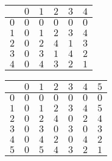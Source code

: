 \begin{figure}
    \centering
    \begin{minipage}{.5\textwidth}
        \centering
        \label{fig:prod_mod_5}
        \begin{tabular}{l|l|l|l|l|l|}
            \cline{2-6}
                                      & $0$ & $1$ & $2$ & $3$ & $4$ \\ \hline
            \multicolumn{1}{|l|}{$0$} & $0$ & $0$ & $0$ & $0$ & $0$ \\ \hline
            \multicolumn{1}{|l|}{$1$} & $0$ & $1$ & $2$ & $3$ & $4$ \\ \hline
            \multicolumn{1}{|l|}{$2$} & $0$ & $2$ & $4$ & $1$ & $3$ \\ \hline
            \multicolumn{1}{|l|}{$3$} & $0$ & $3$ & $1$ & $4$ & $2$ \\ \hline
            \multicolumn{1}{|l|}{$4$} & $0$ & $4$ & $3$ & $2$ & $1$\\ \hline
        \end{tabular}
    \end{minipage}
    

    \begin{minipage}{.5\textwidth}
        \centering
        \label{fig:prod_mod_6}

        \begin{tabular}{l|l|l|l|l|l|l|}
            \cline{2-7}
                                      & $0$ & $1$ & $2$ & $3$ & $4$ & $5$ \\ \hline
            \multicolumn{1}{|l|}{$0$} & $0$ & $0$ & $0$ & $0$ & $0$ & $0$ \\ \hline
            \multicolumn{1}{|l|}{$1$} & $0$ & $1$ & $2$ & $3$ & $4$ & $5$ \\ \hline
            \multicolumn{1}{|l|}{$2$} & $0$ & $2$ & $4$ & $0$ & $2$ & $4$ \\ \hline
            \multicolumn{1}{|l|}{$3$} & $0$ & $3$ & $0$ & $3$ & $0$ & $3$ \\ \hline
            \multicolumn{1}{|l|}{$4$} & $0$ & $4$ & $2$ & $0$ & $4$ & $2$ \\ \hline
            \multicolumn{1}{|l|}{$5$} & $0$ & $5$ & $4$ & $3$ & $2$ & $1$ \\ \hline
        \end{tabular}
    \end{minipage}
\end{figure}

